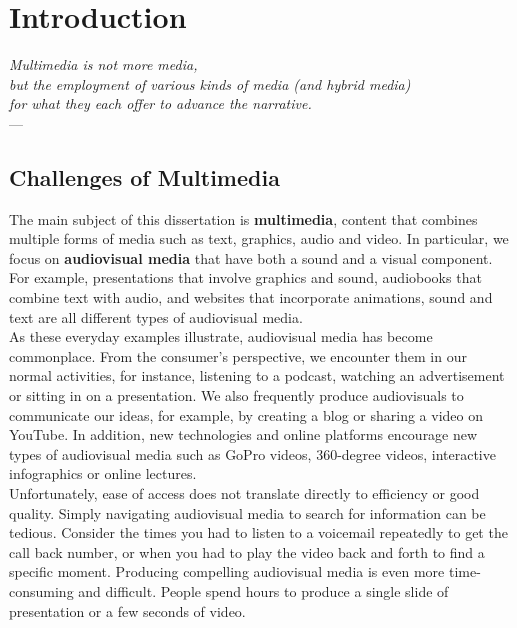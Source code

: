 
\chapter{Introduction} %

\label{ch:introduction} %

\begin{flushright}{\slshape    
Multimedia is not more media, \\ 
but the employment of various kinds of media (and hybrid media) \\ 
for what they each offer to advance the narrative.} \\ \medskip
---  \citep{ritchin:2013}
\end{flushright}

\section{Challenges of Multimedia}
The main subject of this dissertation is \textbf{multimedia}, content that combines multiple forms of media such as text, graphics, audio and video. In particular, we focus on \textbf{audiovisual media} that have both a sound and a visual component. For example, presentations that involve graphics and sound, audiobooks that combine text with audio, and websites that incorporate animations, sound and text are all different types of audiovisual media. \\

As these everyday examples illustrate, audiovisual media has become commonplace. From the consumer's perspective, we encounter them in our normal activities, for instance, listening to a podcast, watching an advertisement or sitting in on a presentation. We also frequently produce audiovisuals to communicate our ideas, for example, by creating a blog or sharing a video on YouTube. In addition, new technologies and online platforms encourage new types of audiovisual media such as GoPro videos, 360-degree videos, interactive infographics or online lectures.\\ 

Unfortunately, ease of access does not translate directly to efficiency or good quality. Simply navigating audiovisual media to search for information can be tedious. Consider the times you had to listen to a voicemail repeatedly to get the call back number, or when you had to play the video back and forth to find a specific moment. Producing compelling audiovisual media is even more time-consuming and difficult. People spend hours to produce a single slide of presentation or a few seconds of video.\\ 

